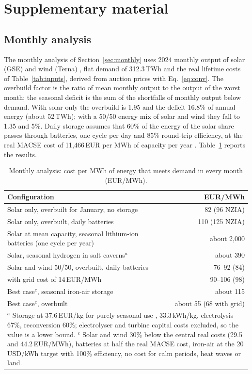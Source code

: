 
\appendix
\section*{Supplementary material}
\renewcommand{\thesubsection}{S\arabic{subsection}}
\renewcommand{\thetable}{S\arabic{table}}
\setcounter{table}{0}

\subsection{Monthly analysis}\label{app:monthly}
The monthly analysis of Section~\ref{sec:monthly} uses 2024 monthly output of solar (GSE) and wind (Terna) \citep{GSE2025,Terna2025m}, flat demand of 312.3\,TWh and the real lifetime costs of Table~\ref{tab:inputs}, derived from auction prices with Eq.~\eqref{eq:conv}. The overbuild factor is the ratio of mean monthly output to the output of the worst month; the seasonal deficit is the sum of the shortfalls of monthly output below demand. With solar only the overbuild is 1.95 and the deficit 16.8\% of annual energy (about 52\,TWh); with a 50/50 energy mix of solar and wind they fall to 1.35 and 5\%. Daily storage assumes that 60\% of the energy of the solar share passes through batteries, one cycle per day and 85\% round-trip efficiency, at the real MACSE cost of 11{,}466\,EUR per MWh of capacity per year \citep{MACSE2025}. Table~\ref{tab:monthly} reports the results.

\begin{table}[htbp]
\centering\small
\caption{Monthly analysis: cost per MWh of energy that meets demand in every month (EUR/MWh).}\label{tab:monthly}
\begin{tabular}{p{9.2cm}r}
\toprule
Configuration & EUR/MWh \\
\midrule
Solar only, overbuilt for January, no storage & 82 (96 NZIA) \\
Solar only, overbuilt, daily batteries & 110 (125 NZIA) \\
Solar at mean capacity, seasonal lithium-ion batteries (one cycle per year) & about 2{,}000 \\
Solar, seasonal hydrogen in salt caverns$^a$ & about 390 \\
Solar and wind 50/50, overbuilt, daily batteries & 76--92 (84) \\
\quad with grid cost of 14\,EUR/MWh \citep{Franzmann2026} & 90--106 (98) \\
Best case$^c$, seasonal iron-air storage & about 115 \\
Best case$^c$, overbuilt & about 55 (68 with grid) \\
\bottomrule
\multicolumn{2}{p{11.5cm}}{\footnotesize $^a$ Storage at 37.6\,EUR/kg for purely seasonal use \citep{DCU2026}, 33.3\,kWh/kg, electrolysis 67\%, reconversion 60\%; electrolyser and turbine capital costs excluded, so the value is a lower bound. $^c$ Solar and wind 30\% below the central real costs (29.5 and 44.2\,EUR/MWh), batteries at half the real MACSE cost, iron-air at the 20\,USD/kWh target \citep{Form2026} with 100\% efficiency, no cost for calm periods, heat waves or land.}\\
\end{tabular}
\end{table}

